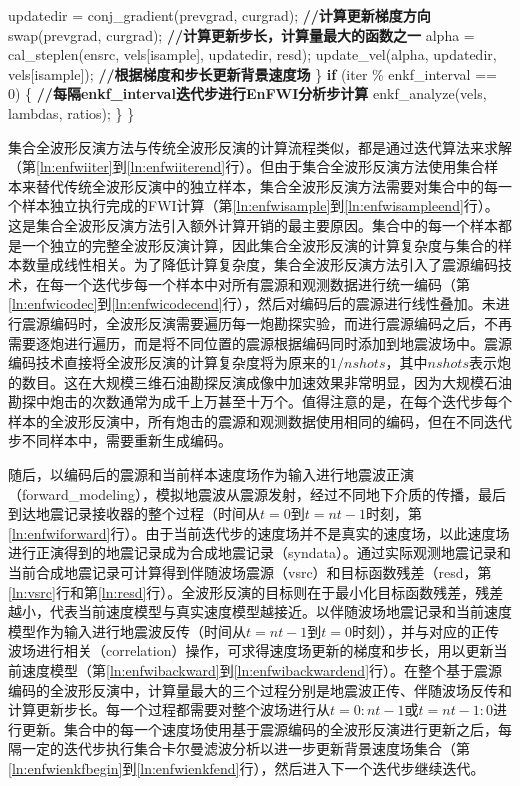 \begin{algorithm}[ht]
\begin{algorithmic}[1]
\State \quad\quad\quad\quad updatedir = conj\_gradient(prevgrad, curgrad); \textbf{//计算更新梯度方向}
\State \quad\quad\quad\quad swap(prevgrad, curgrad);
\State
\State \quad\quad\quad\quad \textbf{//计算更新步长，计算量最大的函数之一}
\State \quad\quad\quad\quad alpha = cal\_steplen(ensrc, vels[isample], updatedir, resd);
\State \quad\quad\quad\quad update\_vel(alpha, updatedir, vels[isample]); \textbf{//根据梯度和步长更新背景速度场} \label{ln:enfwibackwardend}
\State \quad\quad \} \label{ln:enfwisampleend}
\State
\State \quad\quad \textbf{if} (iter \% enkf\_interval == 0) \{ \textbf{//每隔enkf\_interval迭代步进行EnFWI分析步计算} \label{ln:enfwienkfbegin}
\State \quad\quad\quad\quad enkf\_analyze(vels, lambdas, ratios);
\State \quad\quad \} \label{ln:enfwienkfend}
\State \} \label{ln:enfwiiterend}
\end{algorithmic}
\end{algorithm}

集合全波形反演方法与传统全波形反演的计算流程类似，都是通过迭代算法来求解（第\ref{ln:enfwiiter}到\ref{ln:enfwiiterend}行）。但由于集合全波形反演方法使用集合样本来替代传统全波形反演中的独立样本，集合全波形反演方法需要对集合中的每一个样本独立执行完成的FWI计算（第\ref{ln:enfwisample}到\ref{ln:enfwisampleend}行）。这是集合全波形反演方法引入额外计算开销的最主要原因。集合中的每一个样本都是一个独立的完整全波形反演计算，因此集合全波形反演的计算复杂度与集合的样本数量成线性相关。为了降低计算复杂度，集合全波形反演方法引入了震源编码技术，在每一个迭代步每一个样本中对所有震源和观测数据进行统一编码（第\ref{ln:enfwicodec}到\ref{ln:enfwicodecend}行），然后对编码后的震源进行线性叠加。未进行震源编码时，全波形反演需要遍历每一炮勘探实验，而进行震源编码之后，不再需要逐炮进行遍历，而是将不同位置的震源根据编码同时添加到地震波场中。震源编码技术直接将全波形反演的计算复杂度将为原来的$1/nshots$，其中$nshots$表示炮的数目。这在大规模三维石油勘探反演成像中加速效果非常明显，因为大规模石油勘探中炮击的次数通常为成千上万甚至十万个。值得注意的是，在每个迭代步每个样本的全波形反演中，所有炮击的震源和观测数据使用相同的编码，但在不同迭代步不同样本中，需要重新生成编码。

随后，以编码后的震源和当前样本速度场作为输入进行地震波正演（forward\_modeling），模拟地震波从震源发射，经过不同地下介质的传播，最后到达地震记录接收器的整个过程（时间从$t=0$到$t=nt-1$时刻，第\ref{ln:enfwiforward}行）。由于当前迭代步的速度场并不是真实的速度场，以此速度场进行正演得到的地震记录成为合成地震记录（syndata）。通过实际观测地震记录和当前合成地震记录可计算得到伴随波场震源（vsrc）和目标函数残差（resd，第\ref{ln:vsrc}行和第\ref{ln:resd}行）。全波形反演的目标则在于最小化目标函数残差，残差越小，代表当前速度模型与真实速度模型越接近。以伴随波场地震记录和当前速度模型作为输入进行地震波反传（时间从$t=nt-1$到$t=0$时刻），并与对应的正传波场进行相关（correlation）操作，可求得速度场更新的梯度和步长，用以更新当前速度模型（第\ref{ln:enfwibackward}到\ref{ln:enfwibackwardend}行）。在整个基于震源编码的全波形反演中，计算量最大的三个过程分别是地震波正传、伴随波场反传和计算更新步长。每一个过程都需要对整个波场进行从$t=0:nt-1$或$t=nt-1:0$进行更新。集合中的每一个速度场使用基于震源编码的全波形反演进行更新之后，每隔一定的迭代步执行集合卡尔曼滤波分析以进一步更新背景速度场集合（第\ref{ln:enfwienkfbegin}到\ref{ln:enfwienkfend}行），然后进入下一个迭代步继续迭代。

